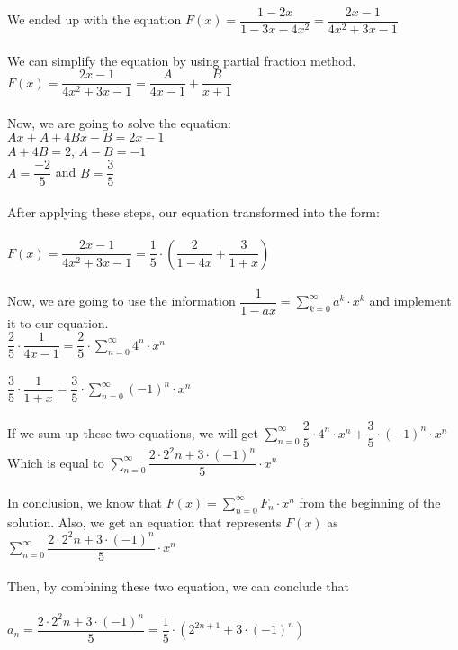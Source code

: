 \documentclass[12pt]{article}
\begin{document}
We ended up with the equation $F(x) = \dfrac{1 - 2x}{1 - 3x - 4x^2} = \dfrac{2x - 1}{4x^2 + 3x -1}$\\
\\
We can simplify the equation by using partial fraction method.\\
$F(x) = \dfrac{2x - 1}{4x^2 + 3x -1} = \dfrac{A}{4x-1} + \dfrac{B}{x+1}$\\
\\
Now, we are going to solve the equation:\\
$Ax + A + 4Bx -B = 2x -1$\\
$A + 4B = 2$, $A-B = -1$\\
$A = \dfrac{-2}{5}$ and $B = \dfrac{3}{5}$\\
\\
After applying these steps, our equation transformed into the form:\\
\\
$F(x) = \dfrac{2x - 1}{4x^2 + 3x -1} = \dfrac{1}{5} \cdot (\dfrac{2}{1-4x} + \dfrac{3}{1+x})$\\
\\
Now, we are going to use the information $\dfrac{1}{1-ax} = \sum^{\infty}_{k=0} a^k \cdot x^k$ and implement it to our equation.\\
$\dfrac{2}{5} \cdot \dfrac{1}{4x-1} = \dfrac{2}{5} \cdot \sum^{\infty}_{n=0} 4^n \cdot x^n$\\
\\
$\dfrac{3}{5} \cdot \dfrac{1}{1+x} = \dfrac{3}{5} \cdot \sum^{\infty}_{n=0} (-1)^n \cdot x^n$\\
\\
If we sum up these two equations, we will get $\sum^{\infty}_{n=0} \dfrac{2}{5} \cdot 4^n \cdot x^n + \dfrac{3}{5} \cdot (-1)^n \cdot x^n$ \\
Which is equal to $\sum^{\infty}_{n=0} \dfrac{2 \cdot 2^2n + 3\cdot(-1)^n}{5} \cdot x^n$\\
\\
In conclusion, we know that $F(x) = \sum^{\infty}_{n=0} F_n \cdot x^n$ from the beginning of the solution. Also, we get an equation that represents $F(x)$ as  $\sum^{\infty}_{n=0} \dfrac{2 \cdot 2^2n + 3\cdot(-1)^n}{5} \cdot x^n$\\
\\
Then, by combining these two equation, we can conclude that \\
\\
$a_n = \dfrac{2 \cdot 2^2n + 3\cdot(-1)^n}{5} = \dfrac{1}{5} \cdot (2^{2n + 1} + 3\cdot (-1)^n)$\\
\end{document}
